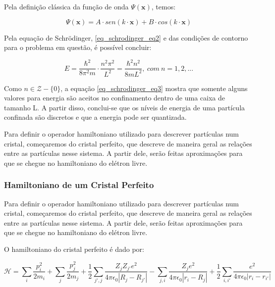     \par Pela definição clássica da função de onda $\Psi(\mathbf{x})$, temos:

    \begin{equation}\label{eq_schrodinger_eq2}
        \Psi (\mathbf{x}) = A \cdot sen(k \cdot \mathbf{x}) + B \cdot cos(k \cdot \mathbf{x})
    \end{equation}

    \par Pela equação de Schrödinger, \eqref{eq_schrodinger_eq2} e das condições de contorno para o problema em questão, é possível concluir:

    \begin{equation}\label{eq_schrodinger_eq3}
      E = \frac{\hbar^2}{8 \pi^2 m} \cdot \frac{n^2\pi^2}{L^2} = \frac{\hbar^2 n^2}{8 m L^2},\ com\ n = 1, 2, ...
    \end{equation}

    \par Como $n \in \mathcal{Z} - \{0\}$, a equação \eqref{eq_schrodinger_eq3} mostra que somente alguns valores para energia são aceitos no confinamento dentro de uma caixa de tamanho L. A partir disso, conclui-se que os níveis de energia de uma partícula confinada são discretos e que a energia pode ser quantizada\cite{frustrado2}.

    \par Para definir o operador hamiltoniano utilizado para descrever partículas num cristal, começaremos do cristal perfeito, que descreve de maneira geral as relações entre as partículas nesse sistema. A partir dele, serão feitas aproximações para que se chegue no hamiltoniano do elétron livre\cite{qm_fis2}.

    \subsubsection{Hamiltoniano de um Cristal Perfeito}

      \par Para definir o operador hamiltoniano utilizado para descrever partículas num cristal, começaremos do cristal perfeito, que descreve de maneira geral as relações entre as partículas nesse sistema. A partir dele, serão feitas aproximações para que se chegue no hamiltoniano do elétron livre\cite{qm_fis2}. 
    
      \par O hamiltoniano do cristal perfeito\cite{frustrado3} é dado por:

      \begin{equation}\label{eq_schrodinger_eq4}
        \mathcal{H} = 
          \sum_{i} \frac{p_{i}^2}{2m_{i}} 
          + \sum_{j} \frac{p_{j}^2}{2m_{j}} 
          + \frac{1}{2} \sum_{j', j} \frac{Z_{j} Z_{j'} e^2}{4\pi\epsilon_{0}\left|R_{j} - R_{j'}\right|}-  \sum_{j, i} \frac{Z_{j} e^2}{4\pi\epsilon_{0}\left|r_{i} - R_{j}\right|} 
          + \frac{1}{2} \sum_{i, i'} \frac{e^2}{4\pi\epsilon_{0}\left|r_{i} - r_{i'}\right|}
      \end{equation}

